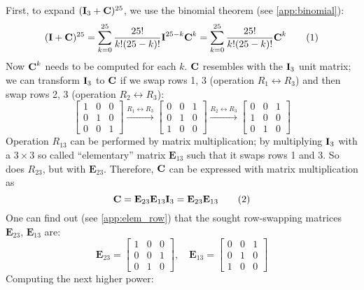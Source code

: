 \documentclass[a4paper]{article}
\begin{document}
First, to expand $(\textbf{I}_3 + \textbf{C})^{25}$, we use the binomial theorem (see \ref{app:binomial}):
\[
    (\textbf{I} + \textbf{C})^{25} = \sum_{k=0}^{25}\frac{25!}{k!(25-k)!}\textbf{I}^{25-k}\textbf{C}^k = \sum_{k=0}^{25}\frac{25!}{k!(25-k)!}\textbf{C}^k
    \label{eq:sum_wrt_c}
    \tag{1}
\]
Now $\textbf{C}^k$ needs to be computed for each $k$. $\textbf{C}$ resembles with the $\textbf{I}_3$ unit matrix; we can transform $\textbf{I}_3$ to $\textbf{C}$ if we swap rows 1, 3 (operation $R_1 \leftrightarrow R_3$) and then swap rows 2, 3 (operation $R_2 \leftrightarrow R_3$):
\[
   \begin{bmatrix}
        1 & 0 & 0\\
        0 & 1 & 0\\
        0 & 0 & 1
    \end{bmatrix}
    \xrightarrow[]{R_1 \leftrightarrow R_3}
    \begin{bmatrix}
        0 & 0 & 1\\
        0 & 1 & 0\\
        1 & 0 & 0
    \end{bmatrix}
    \xrightarrow[]{R_2 \leftrightarrow R_3}
    \begin{bmatrix}
        0 & 0 & 1\\
        1 & 0 & 0\\
        0 & 1 & 0
    \end{bmatrix}
\]
Operation $R_{13}$ can be performed by matrix multiplication; by multiplying $\textbf{I}_3$ with a $3\times 3$ so called ``elementary'' matrix $\textbf{E}_{13}$ such that it swaps rows 1 and 3. So does $R_{23}$, but with $\textbf{E}_{23}$. Therefore, $\textbf{C}$ can be expressed with matrix multiplication as
\[
\textbf{C} = \textbf{E}_{23}\textbf{E}_{13} \textbf{I}_3 = \textbf{E}_{23}\textbf{E}_{13} 
\label{eq:mat_c}
\tag{2}
\]
One can find out (see \ref{app:elem_row}) that the sought row-swapping matrices $\textbf{E}_{23}$, $\textbf{E}_{13}$ are:
\[
    \textbf{E}_{23} = 
    \begin{bmatrix}
        1 & 0 & 0 \\
        0 & 0 & 1 \\
        0 & 1 & 0
    \end{bmatrix}, \quad
    \textbf{E}_{13} = 
    \begin{bmatrix}
        0 & 0 & 1 \\
        0 & 1 & 0 \\
        1 & 0 & 0
    \end{bmatrix}
\]
Computing the next higher power:
\end{document}
